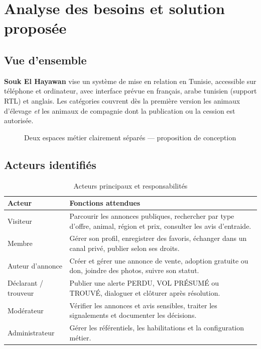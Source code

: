 \chapter{Analyse des besoins et solution proposée}
\section{Vue d’ensemble}
\textbf{Souk El Hayawan} vise un système de mise en relation en Tunisie, accessible sur téléphone et ordinateur, avec interface prévue en français, arabe tunisien (support RTL) et anglais. Les catégories couvrent dès la première version les animaux d’élevage \emph{et} les animaux de compagnie dont la publication ou la cession est autorisée.

\begin{figure}[htbp]\centering

\caption{Deux espaces métier clairement séparés --- proposition de conception}
\label{fig:espaces}
\end{figure}

\section{Acteurs identifiés}
\begin{table}[htbp]\centering\small
\caption{Acteurs principaux et responsabilités}
\begin{tabularx}{\textwidth}{@{}P{32mm}Y@{}}\toprule
\textbf{Acteur} & \textbf{Fonctions attendues}\\\midrule
Visiteur & Parcourir les annonces publiques, rechercher par type d’offre, animal, région et prix, consulter les avis d’entraide.\\
Membre & Gérer son profil, enregistrer des favoris, échanger dans un canal privé, publier selon ses droits.\\
Auteur d’annonce & Créer et gérer une annonce de vente, adoption gratuite ou don, joindre des photos, suivre son statut.\\
Déclarant / trouveur & Publier une alerte PERDU, VOL PRÉSUMÉ ou TROUVÉ, dialoguer et clôturer après résolution.\\
Modérateur & Vérifier les annonces et avis sensibles, traiter les signalements et documenter les décisions.\\
Administrateur & Gérer les référentiels, les habilitations et la configuration métier.\\
\bottomrule\end{tabularx}\end{table}


